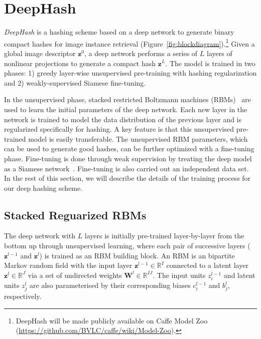 \documentclass[10pt,twocolumn,letterpaper]{article}
\begin{document}
\section{DeepHash}
\label{sec:deepHash}


{\it DeepHash} is a hashing scheme based on a deep network to generate binary compact hashes for image instance retrieval (Figure~\ref{fig:blockdiagram}).\footnote{DeepHash will be made publicly available on Caffe Model Zoo~\cite{Caffe} (\url{https://github.com/BVLC/caffe/wiki/Model-Zoo}).} Given a global image descriptor $\mathbf{z}^0$, a deep network performs a series of $L$ layers of nonlinear projections to generate a compact hash $\mathbf{z}^{L}$. The model is trained in two phases: 1) greedy layer-wise unsupervised pre-training with hashing regularization and 2) weakly-supervised Siamese fine-tuning.

In the unsupervised phase, stacked restricted Boltzmann machines (RBMs)~\cite{HintonDBN} are used to learn the initial parameters of the deep network. Each new layer in the network is trained to model the data distribution of the previous layer and is regularized specifically for hashing. A key feature is that this unsupervised pre-trained model is easily transferable. The unsupervised RBM parameters, which can be used to generate good hashes, can be further optimized with a fine-tuning phase. 
Fine-tuning is done through weak supervision by treating the deep model as a Siamese network~\cite{siamesenetwork}. 
Fine-tuning is also carried out an independent data set.
In the rest of this section, we will describe the details of the training process for our deep hashing scheme.

\subsection{Stacked Reguarized RBMs}
\label{sec:srbm}

The deep network with $L$ layers is initially pre-trained layer-by-layer from the bottom up through unsupervised learning, where each pair of successive layers ($\mathbf{z}^{l-1}$ and $\mathbf{z}^{l}$) is trained as an RBM building block. An RBM is an bipartite Markov random field with the input layer $\mathbf{z}^{l-1}\in\mathbb{R}^{I}$ connected to a latent layer $\mathbf{z}^{l}\in\mathbb{R}^{J}$ via a set of undirected weights $\mathbf{W}^{l}\in\mathbb{R}^{I J}$. The input units $z_{i}^{l-1}$ and latent units $z_{j}^{l}$ are also parameterised by their corresponding biases ${c}_{i}^{l-1}$ and $b_{j}^{l}$, respectively.
\end{document}
